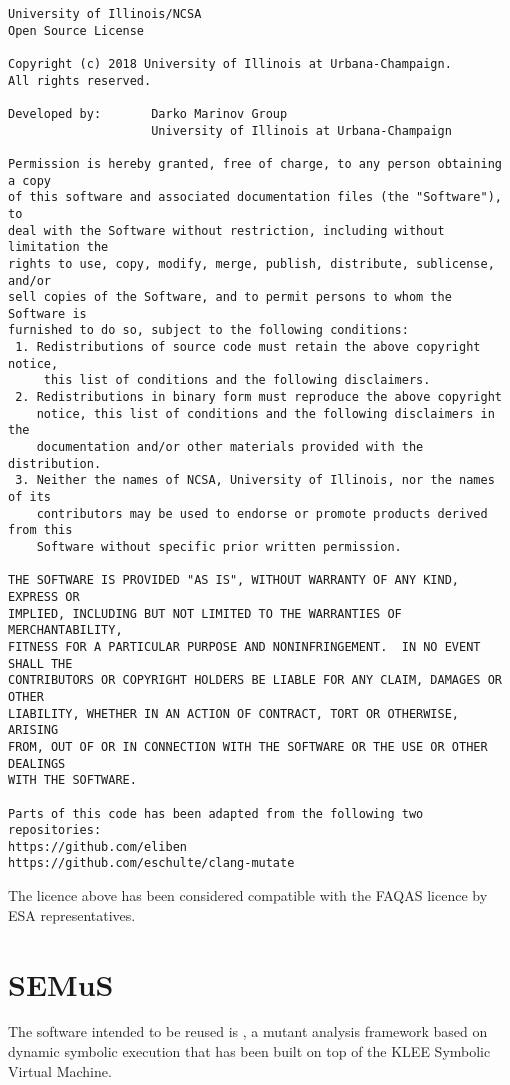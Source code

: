 \begin{lstlisting}[language={}]
University of Illinois/NCSA
Open Source License

Copyright (c) 2018 University of Illinois at Urbana-Champaign.
All rights reserved.

Developed by:       Darko Marinov Group
                    University of Illinois at Urbana-Champaign

Permission is hereby granted, free of charge, to any person obtaining a copy
of this software and associated documentation files (the "Software"), to
deal with the Software without restriction, including without limitation the
rights to use, copy, modify, merge, publish, distribute, sublicense, and/or
sell copies of the Software, and to permit persons to whom the Software is
furnished to do so, subject to the following conditions:
 1. Redistributions of source code must retain the above copyright notice,
     this list of conditions and the following disclaimers.
 2. Redistributions in binary form must reproduce the above copyright
    notice, this list of conditions and the following disclaimers in the
    documentation and/or other materials provided with the distribution.
 3. Neither the names of NCSA, University of Illinois, nor the names of its
    contributors may be used to endorse or promote products derived from this
    Software without specific prior written permission.

THE SOFTWARE IS PROVIDED "AS IS", WITHOUT WARRANTY OF ANY KIND, EXPRESS OR
IMPLIED, INCLUDING BUT NOT LIMITED TO THE WARRANTIES OF MERCHANTABILITY,
FITNESS FOR A PARTICULAR PURPOSE AND NONINFRINGEMENT.  IN NO EVENT SHALL THE
CONTRIBUTORS OR COPYRIGHT HOLDERS BE LIABLE FOR ANY CLAIM, DAMAGES OR OTHER
LIABILITY, WHETHER IN AN ACTION OF CONTRACT, TORT OR OTHERWISE, ARISING
FROM, OUT OF OR IN CONNECTION WITH THE SOFTWARE OR THE USE OR OTHER DEALINGS
WITH THE SOFTWARE.

Parts of this code has been adapted from the following two repositories:
https://github.com/eliben
https://github.com/eschulte/clang-mutate
\end{lstlisting}

The licence above has been considered compatible with the FAQAS licence by ESA representatives.

\section{SEMuS}
\label{sec:semus:reuse}

The software intended to be reused is \SEMU, a mutant analysis framework based on dynamic symbolic execution that has been built on top of the KLEE Symbolic Virtual Machine.

